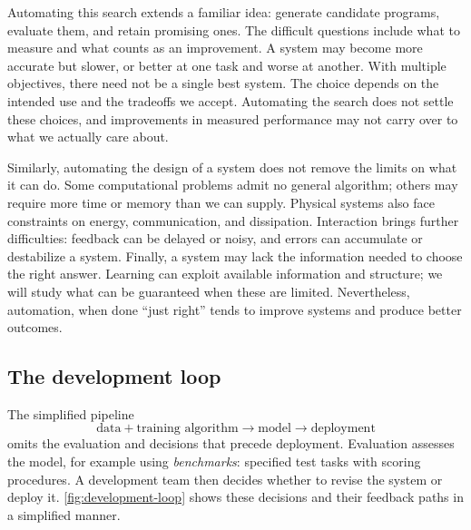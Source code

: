 \documentclass[11pt,twoside]{article}
\theoremstyle{definition}
\theoremstyle{remark}
\begin{document}
Automating this search extends a familiar idea: generate candidate programs, evaluate them, and
retain promising ones. The difficult questions include what to measure and
what counts as an improvement. A system may become more accurate but slower,
or better at one task and worse at another. With multiple objectives, there
need not be a single best system. The choice depends on the intended use and
the tradeoffs we accept. Automating the search does not settle these choices,
and improvements in measured performance may not carry over to what we
actually care about.

Similarly, automating the design of a system does not remove the limits on what it can
do. Some computational problems admit no general algorithm; others may require
more time or memory than we can supply. Physical systems also face constraints
on energy, communication, and dissipation. Interaction brings further
difficulties: feedback can be delayed or noisy, and errors can accumulate or
destabilize a system. Finally, a system may lack the information needed to
choose the right answer. Learning can exploit available information and
structure; we will study what can be guaranteed when these are limited.
Nevertheless, automation, when done ``just right''
tends to improve systems and produce better outcomes.

\subsection{The development loop}

The simplified pipeline
\[
\boxed{\text{data}}+\boxed{\text{training algorithm}}
\longrightarrow \boxed{\text{model}}
\longrightarrow \boxed{\text{deployment}}
\]
omits the evaluation and decisions that precede deployment. Evaluation assesses
the model, for example using \emph{benchmarks}: specified test tasks with scoring
procedures. A development team then decides whether to revise the system or
deploy it. \cref{fig:development-loop} shows these decisions and their
feedback paths in a simplified manner.
\end{document}
